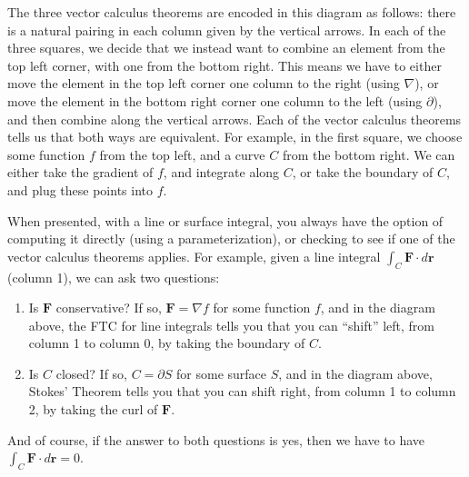 \documentclass[12pt,letterpaper]{amsart}
\newcommand{\dotp}{\,\boldsymbol{\cdot}\,}
\begin{document}
The three vector calculus theorems are encoded in this diagram as follows: there is a natural pairing in each column given by the vertical arrows. In each of the three squares, we decide that we instead want to combine an element from the top left corner, with one from the bottom right. This means we have to either move the element in the top left corner one column to the right (using $\nabla$), or move the element in the bottom right corner one column to the left (using $\partial$), and then combine along the vertical arrows. Each of the vector calculus theorems tells us that both ways are equivalent. For example, in the first square, we choose some function $f$ from the top left, and a curve $C$ from the bottom right. We can either take the gradient of $f$, and integrate along $C$, or take the boundary of $C$, and plug these points into $f$.

When presented, with a line or surface integral, you always have the option of computing it directly (using a parameterization), or checking to see if one of the vector calculus theorems applies. For example, given a line integral $\int_C \mathbf{F}\dotp d\mathbf{r}$ (column 1), we can ask two questions:
\begin{enumerate}
\item Is $\mathbf{F}$ conservative? If so, $\mathbf{F}=\nabla f$ for some function $f$, and in the diagram above, the FTC for line integrals tells you that you can ``shift'' left, from column 1 to column 0, by taking the boundary of $C$.
\item Is $C$ closed? If so, $C=\partial S$ for some surface $S$, and in the diagram above, Stokes' Theorem tells you that you can shift right, from column 1 to column 2, by taking the curl of $\mathbf{F}$.
\end{enumerate}
And of course, if the answer to both questions is yes, then we have to have $\int_C \mathbf{F}\dotp d\mathbf{r}=0$.
\end{document}
